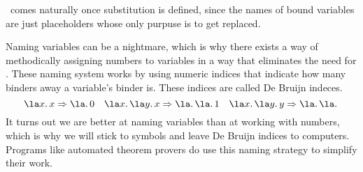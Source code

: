 \begin{remark}
  \aequiv \ comes naturally once substitution is defined, since the names of bound variables are just placeholders whose only purpuse is to get replaced.
\end{remark}
Naming variables can be a nightmare, which is why there exists a way of methodically assigning numbers to variables in a way that eliminates the need for \aequiv. These naming system works by using numeric indices that indicate how many binders away a variable’s binder is. These indices are called De Bruijn indeces.
\[
  \la x.\, x \Rightarrow \la.\, 0 \quad \la x.\, \la y.\, x \Rightarrow \la.\, \la.\, 1 \quad \la x.\, \la y.\, y \Rightarrow \la.\, \la.\,
\]
It turns out we are better at naming variables than at working with numbers, which is why we will stick to symbols and leave De Bruijn indices to computers. Programs like automated theorem provers do use this naming strategy to simplify their work.

